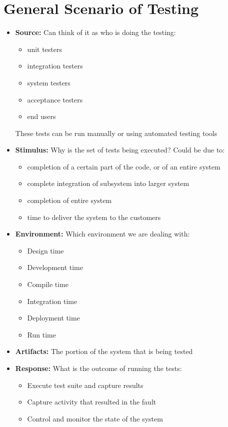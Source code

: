 \documentclass{report}
\begin{document}
\section{General Scenario of Testing}
\begin{itemize}
\item   
   \textbf{Source:}
   Can think of it as who is doing the testing:
   \begin{itemize}
   \item unit testers
   \item integration testers
   \item system testers
   \item acceptance testers
   \item end users
   \end{itemize}
   These tests can be run manually or using automated testing tools
   
\item 
   \textbf{Stimulus:} 
   Why is the set of tests being executed? 
   Could be due to:
   \begin{itemize}
   \item completion of a certain part of the code, or of an entire system
   \item complete integration of subsystem into larger system
   \item completion of entire system
   \item time to deliver the system to the customers
   \end{itemize}
   
    
\item 
   \textbf{Environment:}
   Which environment we are dealing with:
   \begin{itemize}
   \item Design time
   \item Development time
   \item Compile time
   \item Integration time
   \item Deployment time
   \item Run time
   \end{itemize}  

\item
   \textbf{Artifacts:}
   The portion of the system that is being tested

\item 
   \textbf{Response:}
   What is the outcome of running the tests:
   \begin{itemize}
   \item Execute test suite and capture results
   \item Capture activity that resulted in the fault
   \item Control and monitor the state of the system
   \end{itemize} 


\end{itemize}
\end{document}
